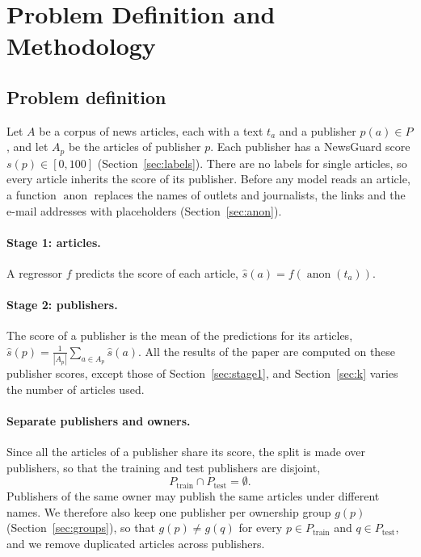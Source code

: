 \documentclass[11pt,a4paper]{article}
\newcommand{\anon}{\operatorname{anon}}
\begin{document}
\section{Problem Definition and Methodology}\label{sec:problem}

\subsection{Problem definition}\label{sec:definition}
Let $A$ be a corpus of news articles, each with a text $t_a$ and a publisher $p(a) \in P$, and let $A_p$ be the articles
of publisher $p$. Each publisher has a NewsGuard score $s(p) \in [0, 100]$ (Section~\ref{sec:labels}). There are no
labels for single articles, so every article inherits the score of its publisher. Before any model reads an article, a function $\anon$ replaces the names of
outlets and journalists, the links and the e-mail addresses with placeholders (Section~\ref{sec:anon}).

\paragraph{Stage 1: articles.} A regressor $f$ predicts the score of each article, $\hat{s}(a) = f(\anon(t_a))$.

\paragraph{Stage 2: publishers.} The score of a publisher is the mean of the predictions for its articles,
$\hat{s}(p) = \frac{1}{|A_p|} \sum_{a \in A_p} \hat{s}(a)$. All the results of the paper are computed on these
publisher scores, except those of Section~\ref{sec:stage1}, and Section~\ref{sec:k} varies the number of articles used.

\paragraph{Separate publishers and owners.} Since all the articles of a publisher share its score, the split is made over
publishers, so that the training and test publishers are disjoint,
\begin{equation}\label{eq:disjoint}
P_{\text{train}} \cap P_{\text{test}} = \emptyset .
\end{equation}
Publishers of the same owner may publish the same articles under different names. We therefore also keep one publisher
per ownership group $g(p)$ (Section~\ref{sec:groups}), so that $g(p) \neq g(q)$ for every $p \in P_{\text{train}}$ and
$q \in P_{\text{test}}$, and we remove duplicated articles across publishers.
\end{document}
